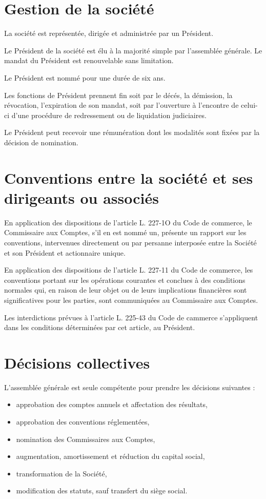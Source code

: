 \documentclass[a4paper,12pt]{report}
\begin{document}
\section{Gestion de la société}
La société est représentée, dirigée et administrée par un Président.

Le Président de la société est élu à la majorité simple par l'assemblée générale. 
Le mandat du Président est renouvelable sans limitation.

Le Président est nommé pour une durée de six ans.

Les fonctions de Président prennent fin soit par le décés, la démission, la révocation, l'expiration de son mandat, 
soit par l'ouverture à l'encontre de celui-ci d'une procédure de redressement ou de liquidation judiciaires.

Le Président peut recevoir une rémunération dont les modalités sont fixées par la décision de nomination.

\section{Conventions entre la société et ses dirigeants ou associés}
En application des dispositions de l'article L. 227-1O du Code de commerce, le Commissaire aux Comptes, s'il en est nommé un, présente un rapport sur les conventions, 
intervenues directement ou par persanne interposée entre la Société et son Président et actionnaire unique.

En application des dispositions de l'article L. 227-11 du Code de commerce, les conventions portant sur les opérations courantes et conclues à des conditions normales qui, 
en raison de leur objet ou de leurs implications financières sont significatives pour les parties, sont communiquées au Commissaire aux Comptes.

Les interdictions prévues à l'article L. 225-43 du Code de cammerce s'appliquent dans les conditions déterminées par cet article, au Président.


\section{Décisions collectives}
L'assemblée générale est seule compétente pour prendre les décisions suivantes :
\begin{itemize}
	\item approbation des comptes annuels et affectation des résultats,
	\item approbation des conventions réglementées,
	\item nomination des Commissaires aux Comptes,
	\item augmentation, amortissement et réduction du capital social,
	\item transformation de la Société,
	\item modification des statuts, sauf transfert du siège social.
\end{itemize}
\end{document}
